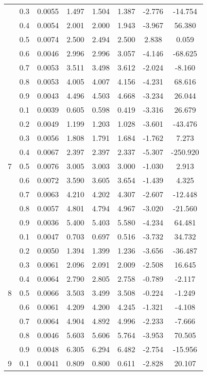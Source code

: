 \documentclass[11pt,a4paper]{report}
\begin{document}
\begin{longtable}{ | c | c || c | c | c | c | c | c | }
 & 0.3 & 0.0055 & 1.497 & 1.504 & 1.387 & -2.776 & -14.754 \\
 & 0.4 & 0.0054 & 2.001 & 2.000 & 1.943 & -3.967 & 56.380 \\
 & 0.5 & 0.0074 & 2.500 & 2.494 & 2.500 & 2.838 & 0.059 \\
 & 0.6 & 0.0046 & 2.996 & 2.996 & 3.057 & -4.146 & -68.625 \\
 & 0.7 & 0.0053 & 3.511 & 3.498 & 3.612 & -2.024 & -8.160 \\
 & 0.8 & 0.0053 & 4.005 & 4.007 & 4.156 & -4.231 & 68.616 \\
 & 0.9 & 0.0043 & 4.496 & 4.503 & 4.668 & -3.234 & 26.044 \\
 \hline
\multirow{9}{*}{7} & 0.1 & 0.0039 & 0.605 & 0.598 & 0.419 & -3.316 & 26.679 \\
 & 0.2 & 0.0049 & 1.199 & 1.203 & 1.028 & -3.601 & -43.476 \\
 & 0.3 & 0.0056 & 1.808 & 1.791 & 1.684 & -1.762 & 7.273 \\
 & 0.4 & 0.0067 & 2.397 & 2.397 & 2.337 & -5.307 & -250.920 \\
 & 0.5 & 0.0076 & 3.005 & 3.003 & 3.000 & -1.030 & 2.913 \\
 & 0.6 & 0.0072 & 3.590 & 3.605 & 3.654 & -1.439 & 4.325 \\
 & 0.7 & 0.0063 & 4.210 & 4.202 & 4.307 & -2.607 & -12.448 \\
 & 0.8 & 0.0057 & 4.801 & 4.794 & 4.967 & -3.020 & -21.560 \\
 & 0.9 & 0.0036 & 5.400 & 5.403 & 5.580 & -4.234 & 64.481 \\
 \hline
\multirow{9}{*}{8} & 0.1 & 0.0047 & 0.703 & 0.697 & 0.516 & -3.732 & 34.732 \\
 & 0.2 & 0.0050 & 1.394 & 1.399 & 1.236 & -3.656 & -36.487 \\
 & 0.3 & 0.0061 & 2.096 & 2.091 & 2.009 & -2.508 & 16.645 \\
 & 0.4 & 0.0064 & 2.790 & 2.805 & 2.758 & -0.789 & -2.117 \\
 & 0.5 & 0.0066 & 3.503 & 3.499 & 3.508 & -0.224 & -1.249 \\
 & 0.6 & 0.0061 & 4.209 & 4.200 & 4.245 & -1.321 & -4.108 \\
 & 0.7 & 0.0064 & 4.904 & 4.892 & 4.996 & -2.233 & -7.666 \\
 & 0.8 & 0.0046 & 5.603 & 5.606 & 5.764 & -3.953 & 70.505 \\
 & 0.9 & 0.0048 & 6.305 & 6.294 & 6.482 & -2.754 & -15.956 \\
 \hline
\multirow{9}{*}{9} & 0.1 & 0.0041 & 0.809 & 0.800 & 0.611 & -2.828 & 20.107 \\

\end{longtable}
\end{document}
